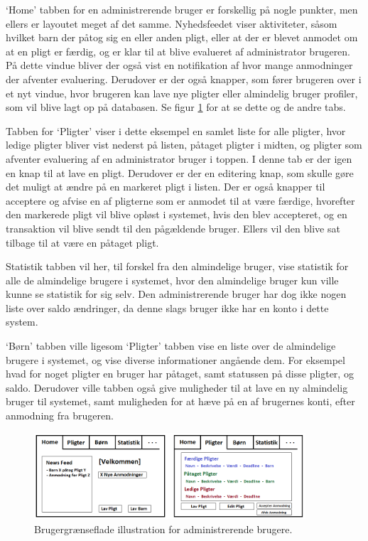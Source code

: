 ‘Home’ tabben for en administrerende bruger er forskellig på nogle punkter, men ellers er layoutet meget af det samme. Nyhedsfeedet viser aktiviteter, såsom hvilket barn der påtog sig en eller anden pligt, eller at der er blevet anmodet om at en pligt er færdig, og er klar til at blive evalueret af administrator brugeren. På dette vindue bliver der også vist en notifikation af hvor mange anmodninger der afventer evaluering. Derudover er der også knapper, som fører brugeren over i et nyt vindue, hvor brugeren kan lave nye pligter eller almindelig bruger profiler, som vil blive lagt op på databasen. Se figur \ref{ForalderUI} for at se dette og de andre tabs.

Tabben for ‘Pligter’ viser i dette eksempel en samlet liste for alle pligter, hvor ledige pligter bliver vist nederst på listen, påtaget pligter i midten, og pligter som afventer evaluering af en administrator bruger i toppen. I denne tab er der igen en knap til at lave en pligt. Derudover er der en editering knap, som skulle gøre det muligt at ændre på en markeret pligt i listen. Der er også knapper til acceptere og afvise en af pligterne som er anmodet til at være færdige, hvorefter den markerede pligt vil blive opløst i systemet, hvis den blev accepteret, og en transaktion vil blive sendt til den pågældende bruger. Ellers vil den blive sat tilbage til at være en påtaget pligt. 

Statistik tabben vil her, til forskel fra den almindelige bruger, vise statistik for alle de almindelige brugere i systemet, hvor den almindelige bruger kun ville kunne se statistik for sig selv. Den administrerende bruger har dog ikke nogen liste over saldo ændringer, da denne slags bruger ikke har en konto i dette system. 

‘Børn’ tabben ville ligesom ‘Pligter’ tabben vise en liste over de almindelige brugere i systemet, og vise diverse informationer angående dem. For eksempel hvad for noget pligter en bruger har påtaget, samt statussen på disse pligter, og saldo. Derudover ville tabben også give muligheder til at lave en ny almindelig bruger til systemet, samt muligheden for at hæve på en af brugernes konti, efter anmodning fra brugeren.

\begin{figure}[H]
\centering
\includegraphics[width=0.9\textwidth]{Billeder/ForalderUI.png}
\caption{Brugergrænseflade illustration for administrerende brugere.}
\label{ForalderUI}
\end{figure}